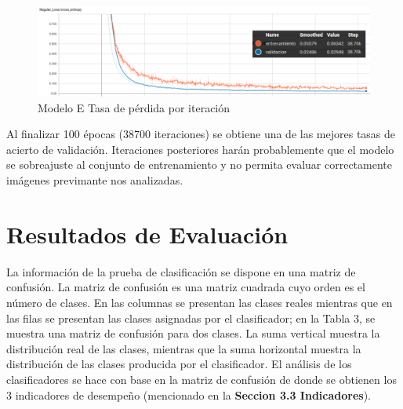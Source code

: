 			\begin{figure}[H]
				\begin{center}
				\includegraphics[width=1\textwidth]{images/desarrollo/trainResults/model7Loss} 
				\end{center}
				\begin{center}
				\caption{\small{Modelo E Tasa de pérdida por iteración}}
				\vspace{-1em}
				{\small{\fontsize{10}{16.8}\selectfont {Fuente propia}}}
				\end{center}
				\vspace{-1.5em}
			\end{figure}
		
			Al finalizar 100 épocas (38700 iteraciones) se obtiene una de las mejores tasas de acierto de validación. Iteraciones posteriores harán probablemente que el modelo se sobreajuste al conjunto de entrenamiento y no permita evaluar correctamente imágenes previmante nos analizadas.



\section{Resultados de Evaluación}  

		
		La información de la prueba de clasificación se dispone en una matriz de confusión. La matriz de confusión es una matriz cuadrada cuyo orden es el número de clases. En las  columnas se presentan las clases reales mientras que en las filas se presentan las clases asignadas por el clasificador; en la Tabla 3, se muestra una matriz de confusión para dos clases. La suma vertical muestra la distribución real de las clases, mientras que la suma horizontal muestra la distribución de las clases producida por el clasificador. El análisis de los clasificadores se hace con base en la matriz de confusión de donde se obtienen los 3 indicadores de desempeño (mencionado en la \textbf{Seccion 3.3 Indicadores}).

